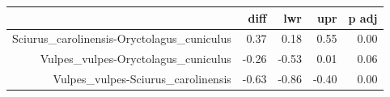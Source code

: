 \begin{table}[ht]
\centering
\begin{tabular}{rrrrr}
  \hline
 & diff & lwr & upr & p adj \\ 
  \hline
Sciurus\_carolinensis-Oryctolagus\_cuniculus & 0.37 & 0.18 & 0.55 & 0.00 \\ 
  Vulpes\_vulpes-Oryctolagus\_cuniculus & -0.26 & -0.53 & 0.01 & 0.06 \\ 
  Vulpes\_vulpes-Sciurus\_carolinensis & -0.63 & -0.86 & -0.40 & 0.00 \\ 
   \hline
\end{tabular}
\end{table}
